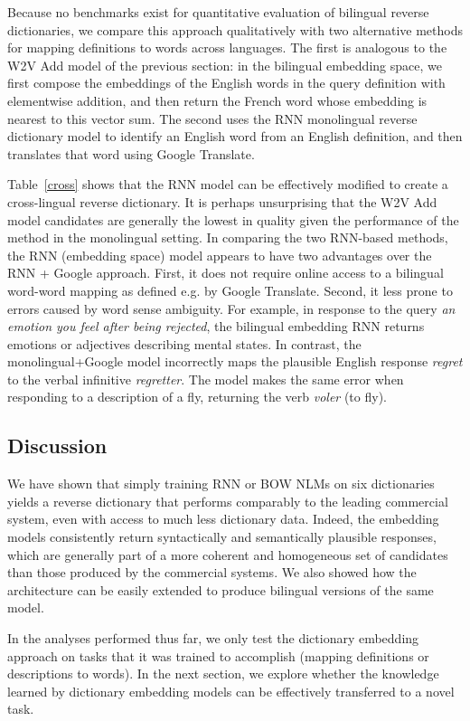 Because no benchmarks exist for quantitative evaluation of bilingual reverse dictionaries, we compare this approach qualitatively with two alternative methods for mapping definitions to words across languages. The first is analogous to the W2V Add model of the previous section: in the bilingual embedding space, we first compose the embeddings of the English words in the query definition with elementwise addition, and then return the French word whose embedding is nearest to this vector sum. The second uses the RNN monolingual reverse dictionary model to identify an English word from an English definition, and then translates that word using Google Translate.

Table~\ref{cross} shows that the RNN model can be effectively modified to create a cross-lingual reverse dictionary. It is perhaps unsurprising that the W2V Add model candidates are generally the lowest in quality given the performance of the method in the monolingual setting. In comparing the two RNN-based methods, the RNN (embedding space) model appears to have two advantages over the RNN + Google approach. First, it does not require online access to a bilingual word-word mapping as defined e.g. by Google Translate. Second, it less prone to errors caused by word sense ambiguity. For example, in response to the query \emph{an emotion you feel after being rejected}, the bilingual embedding RNN returns emotions or adjectives describing mental states. In contrast, the monolingual+Google model incorrectly maps the plausible English response \emph{regret} to the verbal infinitive \emph{regretter}. The model makes the same error when responding to a description of a fly, returning the verb \emph{voler} (to fly). 


\subsection{Discussion}

We have shown that simply training RNN or BOW NLMs on six dictionaries yields a reverse dictionary that performs comparably to the leading commercial system, even with access to much less dictionary data. Indeed, the embedding models consistently return syntactically and semantically plausible responses, which are generally part of a more coherent and homogeneous set of candidates than those produced by the commercial systems. We also showed how the architecture can be easily extended to produce bilingual versions of the same model. 

In the analyses performed thus far, we only test the dictionary embedding approach on tasks that it was trained to accomplish
 (mapping definitions or descriptions to words). In the next section, we explore whether the knowledge learned by dictionary embedding models can be effectively transferred to a novel task. 

